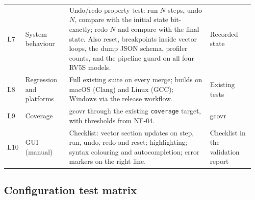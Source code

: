 \documentclass[11pt]{article}
\begin{document}
\begin{longtable}{@{}L{0.9cm}L{2.7cm}L{7.8cm}L{2.9cm}@{}}
L7 & System behaviour & Undo/redo property test: run $N$ steps, undo $N$, compare with the initial state bit-exactly; redo $N$ and compare with the final state. Also reset, breakpoints inside vector loops, the dump JSON schema, profiler counts, and the pipeline guard on all four RV5S models. & Recorded state \\
L8 & Regression and platforms & Full existing suite on every merge; builds on macOS (Clang) and Linux (GCC); Windows via the release workflow. & Existing tests \\
L9 & Coverage & gcovr through the existing \texttt{coverage} target, with thresholds from NF-04. & gcovr \\
L10 & GUI (manual) & Checklist: vector section updates on step, run, undo, redo and reset; highlighting; syntax colouring and autocompletion; error markers on the right line. & Checklist in the validation report \\
\bottomrule
\end{longtable}
\normalsize

\subsection{Configuration test matrix}
\end{document}
